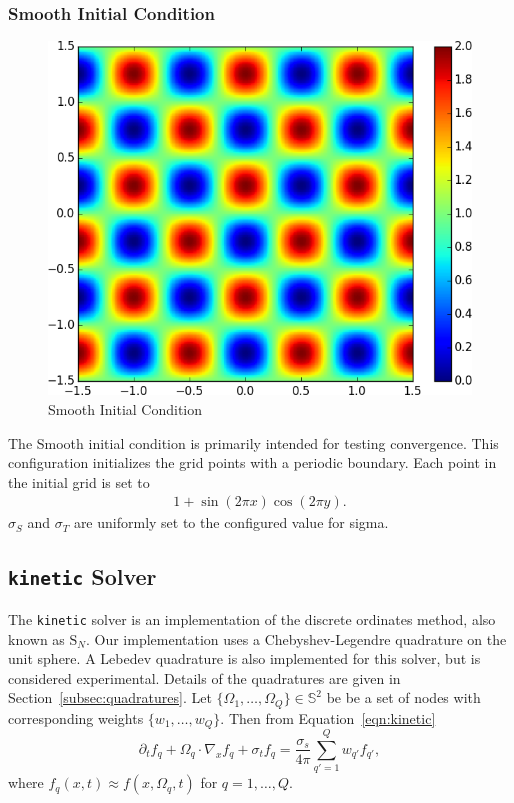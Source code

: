 \documentclass{article}
\newcommand{\twosphere}{\ensuremath{\mathbb{S}^2}\xspace}
\newcommand{\kinetic}{\texttt{kinetic}\xspace}
\begin{document}
\subsubsection{Smooth Initial Condition}
\begin{figure}
    \centering
    \includegraphics[height=0.3\textheight]{initcond_smooth.png}
    \caption{Smooth Initial Condition}
\end{figure}
The Smooth initial condition is primarily intended for testing convergence.
This configuration initializes the grid points with a periodic boundary.
Each point in the initial grid is set to
\begin{align}
1 + \sin(2\pi x)\cos(2\pi y).
\end{align}
$\sigma_S$ and $\sigma_T$ are uniformly set to the configured
value for sigma.

\subsection{\kinetic Solver}
The \kinetic solver is an implementation of the discrete ordinates method, also known
as $\mathrm{S}_N$.
Our implementation uses a Chebyshev-Legendre quadrature on the unit sphere.
A Lebedev quadrature is also implemented for this solver,
but is considered experimental.
Details of the quadratures are given in Section~\ref{subsec:quadratures}. Let
$\{\Omega_1, \dots, \Omega_Q\} \in \twosphere$ be be a set of nodes with
corresponding weights $\{w_1, \dots, w_Q\}$. Then from Equation~\ref{eqn:kinetic}
\begin{equation}
    \partial_t f_q + \Omega_q \cdot \nabla_x f_q + \sigma_t f_q=
    \frac{\sigma_s}{4\pi} \sum_{q'=1}^Q w_{q'} f_{q'},
\end{equation}
where $f_q(x,t) \approx f(x, \Omega_q, t)$ for $q = 1, \dots, Q$.
\end{document}
